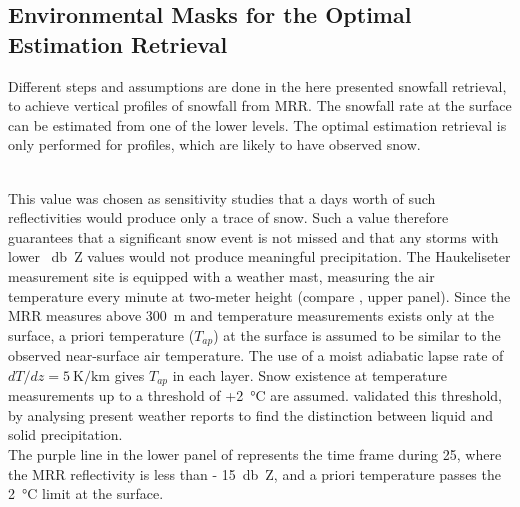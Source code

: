 \subsection{Environmental Masks for the Optimal Estimation Retrieval}\label{sec:pre_snow}
Different steps and assumptions are done in the here presented snowfall retrieval, to achieve vertical profiles of snowfall from MRR. The snowfall rate at the surface can be estimated from one of the lower levels. The optimal estimation retrieval is only performed for profiles, which are likely to have observed snow. 

\noindent
\\
This value was  chosen as sensitivity studies \citep[e.g.][]{wood_level_2013} that a days worth of such reflectivities would produce only a trace of snow.  Such a value therefore guarantees that a significant snow event is not missed and that any storms with lower \SI{}{\decibel Z} values would not produce meaningful precipitation.
The Haukeliseter measurement site is equipped with a weather mast, measuring the air temperature every minute at two-meter height (compare , upper panel). 
Since the MRR measures above \SI{300}{\metre} and temperature measurements exists only at the surface, a priori temperature ($T_{ap}$) at the surface is assumed to be similar to the observed near-surface air temperature. The use of a moist adiabatic lapse rate of $dT/dz = \SI{5}{\kelvin\per\km}$ gives $T_{ap}$ in each layer. 
Snow existence at temperature measurements up to a threshold of +\SI{2}{\celsius} are assumed. \citet{liu_g._deriving_2008} validated this threshold, by analysing present weather reports to find the distinction between liquid and solid precipitation.\\
The purple line in the lower panel of  represents the time frame during \SI{25}{\dec}, where the MRR reflectivity is less than \SI{- 15}{\decibel Z}, and a priori temperature passes the \SI{2}{\celsius} limit at the surface.  
